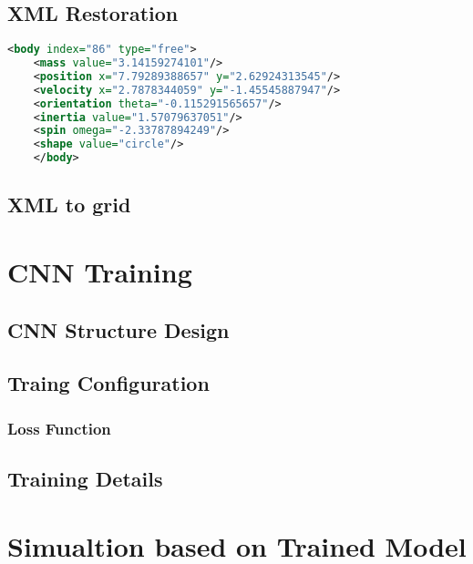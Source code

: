 \subsection{XML Restoration}

\begin{lstlisting}[language=XML]
    <body index="86" type="free">
    <mass value="3.14159274101"/>
    <position x="7.79289388657" y="2.62924313545"/>
    <velocity x="2.7878344059" y="-1.45545887947"/>
    <orientation theta="-0.115291565657"/>
    <inertia value="1.57079637051"/>
    <spin omega="-2.33787894249"/>
    <shape value="circle"/>
    </body>
\end{lstlisting}

\subsection{XML to grid}


\section{CNN Training}

\subsection{CNN  Structure Design}

\subsection{Traing Configuration}
\subsubsection{Loss Function}

\subsection{Training Details}

\section{Simualtion based on Trained Model}
